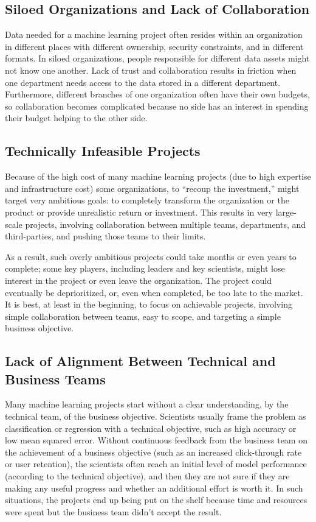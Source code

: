 \subsection*{Siloed Organizations and Lack of Collaboration}
Data needed for a machine learning project often resides within an organization in different
places with different ownership, security constraints, and in different formats. In siloed
organizations, people responsible for different data assets might not know one another.
Lack of trust and collaboration results in friction when one department needs access to the data
stored in a different department. Furthermore, different branches of one organization often
have their own budgets, so collaboration becomes complicated because no side has an interest
in spending their budget helping to the other side.



\subsection*{Technically Infeasible Projects}
Because of the high cost of many machine learning projects (due to high expertise and infrastructure
cost) some organizations, to “recoup the investment,” might target very ambitious
goals: to completely transform the organization or the product or provide unrealistic return or
investment. This results in very large-scale projects, involving collaboration between multiple
teams, departments, and third-parties, and pushing those teams to their limits.

As a result, such overly ambitious projects could take months or even years to complete;
some key players, including leaders and key scientists, might lose interest in the project or
even leave the organization. The project could eventually be deprioritized, or, even when
completed, be too late to the market. It is best, at least in the beginning, to focus on achievable
projects, involving simple collaboration between teams, easy to scope, and targeting a simple
business objective.





\subsection*{Lack of Alignment Between Technical and Business Teams}
Many machine learning projects start without a clear understanding, by the technical team, of
the business objective. Scientists usually frame the problem as classification or regression with
a technical objective, such as high accuracy or low mean squared error. Without continuous
feedback from the business team on the achievement of a business objective (such as an
increased click-through rate or user retention), the scientists often reach an initial level of
model performance (according to the technical objective), and then they are not sure if they
are making any useful progress and whether an additional effort is worth it. In such situations,
the projects end up being put on the shelf because time and resources were spent but the
business team didn't accept the result.


